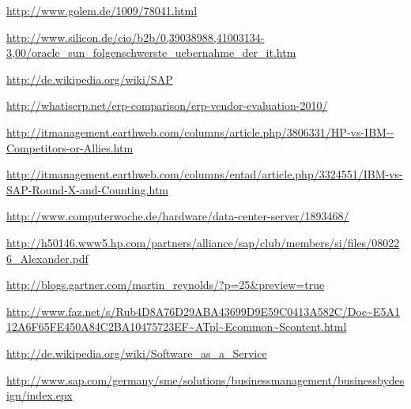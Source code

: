 \documentclass[a4paper,10pt,left=1.5cm,right=1.5cm,top=1.5cm,bottom=1.5cm]{article}
\begin{document}
\begin{thebibliography}{5}
  \newblock \url{http://www.golem.de/1009/78041.html}

  \newblock \url{http://www.silicon.de/cio/b2b/0,39038988,41003134-3,00/oracle_sun_folgenschwerste_uebernahme_der_it.htm}

  \newblock \url{http://de.wikipedia.org/wiki/SAP}

  \newblock \url{http://whatiserp.net/erp-comparison/erp-vendor-evaluation-2010/}

  \newblock \url{http://itmanagement.earthweb.com/columns/article.php/3806331/HP-vs-IBM--Competitors-or-Allies.htm}

  \newblock \url{http://itmanagement.earthweb.com/columns/entad/article.php/3324551/IBM-vs-SAP-Round-X-and-Counting.htm}

  \newblock \url{http://www.computerwoche.de/hardware/data-center-server/1893468/}

  \newblock \url{http://h50146.www5.hp.com/partners/alliance/sap/club/members/si/files/080226_Alexander.pdf}

  \newblock \url{http://blogs.gartner.com/martin_reynolds/?p=25&preview=true}

  \newblock \url{http://www.faz.net/s/Rub4D8A76D29ABA43699D9E59C0413A582C/Doc~E5A112A6F65FE450A84C2BA10475723EF~ATpl~Ecommon~Scontent.html}

  \newblock \url{http://de.wikipedia.org/wiki/Software_as_a_Service}

  \newblock \url{http://www.sap.com/germany/sme/solutions/businessmanagement/businessbydesign/index.epx}
\end{thebibliography}
\end{document}

